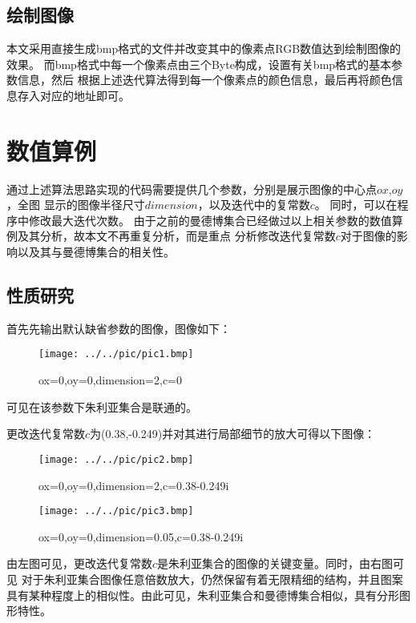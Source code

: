 \subsection{绘制图像}
本文采用直接生成bmp格式的文件并改变其中的像素点RGB数值达到绘制图像的效果。
而bmp格式中每一个像素点由三个Byte构成，设置有关bmp格式的基本参数信息，然后
根据上述迭代算法得到每一个像素点的颜色信息，最后再将颜色信息存入对应的地址即可。

\section{数值算例}
通过上述算法思路实现的代码需要提供几个参数，分别是展示图像的中心点$ox$,$oy$，全图
显示的图像半径尺寸$dimension$，以及迭代中的复常数$c$。
同时，可以在程序中修改最大迭代次数。
由于之前的曼德博集合已经做过以上相关参数的数值算例及其分析，故本文不再重复分析，而是重点
分析修改迭代复常数$c$对于图像的影响以及其与曼德博集合的相关性。

\subsection{性质研究}
\par 
首先先输出默认缺省参数的图像，图像如下：
\begin{figure}[H]
    \centering
    \texttt{[image: ../../pic/pic1.bmp]}
    \caption{ox=0,oy=0,dimension=2,c=0}
\end{figure}
\par
可见在该参数下朱利亚集合是联通的。
\par 
更改迭代复常数$c$为(0.38,-0.249)并对其进行局部细节的放大可得以下图像：
\begin{figure}[H]
    \begin{minipage}[t]{0.5\linewidth}
        \centering
        \texttt{[image: ../../pic/pic2.bmp]}
        \caption{ox=0,oy=0,dimension=2,c=0.38-0.249i}        
    \end{minipage}
    \begin{minipage}[t]{0.5\linewidth}
        \centering
        \texttt{[image: ../../pic/pic3.bmp]}
        \caption{ox=0,oy=0,dimension=0.05,c=0.38-0.249i}        
    \end{minipage}   
\end{figure} 
\par  


由左图可见，更改迭代复常数$c$是朱利亚集合的图像的关键变量。同时，由右图可见
对于朱利亚集合图像任意倍数放大，仍然保留有着无限精细的结构，并且图案
具有某种程度上的相似性。由此可见，朱利亚集合和曼德博集合相似，具有分形图形特性。
\par 
